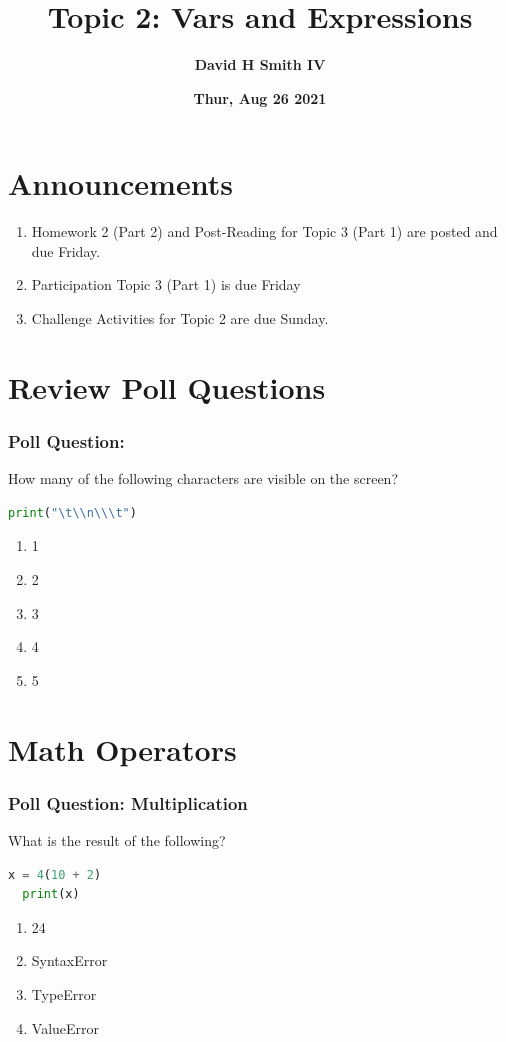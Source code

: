 \documentclass{beamer}
\title{\textbf{Topic 2: Vars and Expressions}}
\author{\textbf{David H Smith IV}}
\institute[\textbf{UIUC}]{\textbf{University of Illinois Urbana-Champaign}}
\date{\textbf{Thur, Aug 26 2021}}
\begin{document}
\frame{\titlepage}

\section{Announcements}

\begin{frame}
  \begin{enumerate}
    \item Homework 2 (Part 2) and Post-Reading for Topic 3 (Part 1) are posted and due Friday.
    \item Participation Topic 3 (Part 1) is due Friday
    \item Challenge Activities for Topic 2 are due Sunday.
  \end{enumerate}
\end{frame}

\section{Review Poll Questions}

%
%
%
\begin{frame}[fragile]
  \frametitle{Poll Question: }
  How many of the following characters are visible on the screen?\\
  \begin{lstlisting}[language=Python, autogobble]
  print("\t\\n\\\t")
  \end{lstlisting}
  \vfill
  \begin{minipage}{.48\textwidth}
    \begin{enumerate}[A]
      \item 1
      \item 2
      \item 3
      \item 4
      \item 5
    \end{enumerate}
  \end{minipage}
  \begin{minipage}{.48\textwidth}
  \end{minipage}
\end{frame}


\section{Math Operators}

%
%
%
\begin{frame}[fragile]
  \frametitle{Poll Question: Multiplication}
  \vfill
  What is the result of the following?
  \begin{lstlisting}[language=Python, autogobble]
  x = 4(10 + 2)
  print(x)
  \end{lstlisting}
  \vfill
  \begin{enumerate}[A]
    \item 24
    \item SyntaxError
    \item TypeError
    \item ValueError
  \end{enumerate}
\end{frame}
\end{document}
